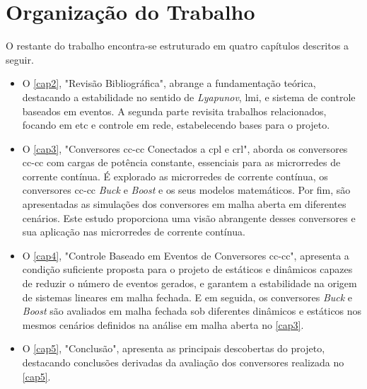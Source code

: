 \section{Organização do Trabalho}

O restante do trabalho encontra-se estruturado em quatro capítulos descritos a seguir.


\begin{itemize}
    \item O \autoref{cap2}, "Revisão Bibliográfica", abrange a fundamentação teórica, destacando a estabilidade no sentido de \textit{Lyapunov}, \acrfull{lmi}, e sistema de controle baseados em eventos. A segunda parte revisita trabalhos relacionados, focando em \acrshort{etc} e controle em rede, estabelecendo bases para o projeto.
    \item O \autoref{cap3}, "Conversores \acrshort{cc}-\acrshort{cc} Conectados a \acrshort{cpl} e \acrshort{crl}", aborda os conversores \acrshort{cc}-\acrshort{cc} com cargas de potência constante, essenciais para as microrredes de corrente contínua. É explorado as microrredes de corrente contínua, os conversores \acrshort{cc}-\acrshort{cc} \textit{Buck} e \textit{Boost} e os seus modelos matemáticos. Por fim, são apresentadas as simulações dos conversores em malha aberta em diferentes cenários. Este estudo proporciona uma visão abrangente desses conversores e sua aplicação nas microrredes de corrente contínua.
    \item O \autoref{cap4}, "Controle Baseado em Eventos de Conversores \acrshort{cc}-\acrshort{cc}", apresenta a condição suficiente proposta para o projeto de  estáticos e dinâmicos capazes de reduzir o número de eventos gerados, e garantem a estabilidade na origem de sistemas lineares em malha fechada. E em seguida, os conversores \textit{Buck} e \textit{Boost} são avaliados em malha fechada sob diferentes  dinâmicos e estáticos nos mesmos cenários definidos na análise em malha aberta no \autoref{cap3}.  
    \item O \autoref{cap5}, "Conclusão", apresenta as principais descobertas do projeto, destacando conclusões derivadas da avaliação dos conversores realizada no \autoref{cap5}.
\end{itemize}



